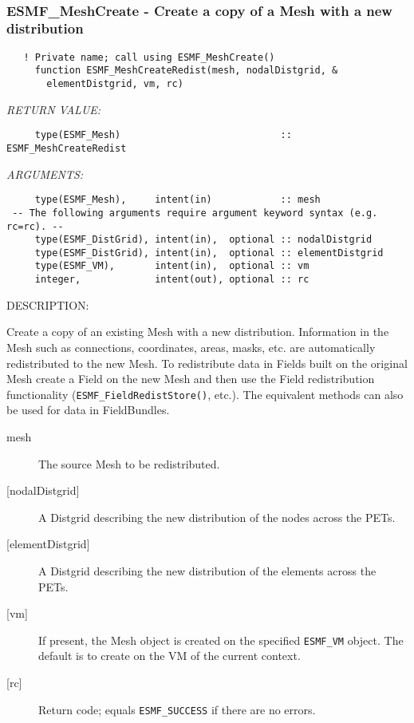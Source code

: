 
\mbox{}\hrulefill\ 
 

 \subsubsection [ESMF\_MeshCreate] {ESMF\_MeshCreate - Create a copy of a Mesh with a new distribution}


  
\begin{verbatim}   ! Private name; call using ESMF_MeshCreate()
     function ESMF_MeshCreateRedist(mesh, nodalDistgrid, &
       elementDistgrid, vm, rc)\end{verbatim}{\em RETURN VALUE:}
\begin{verbatim}     type(ESMF_Mesh)                            :: ESMF_MeshCreateRedist
 \end{verbatim}{\em ARGUMENTS:}
\begin{verbatim}     type(ESMF_Mesh),     intent(in)            :: mesh
 -- The following arguments require argument keyword syntax (e.g. rc=rc). --
     type(ESMF_DistGrid), intent(in),  optional :: nodalDistgrid
     type(ESMF_DistGrid), intent(in),  optional :: elementDistgrid
     type(ESMF_VM),       intent(in),  optional :: vm
     integer,             intent(out), optional :: rc\end{verbatim}
{\sf DESCRIPTION:\\ }


    Create a copy of an existing Mesh with a new distribution. Information
   in the Mesh such as connections, coordinates, areas, masks, etc. are
   automatically redistributed to the new Mesh. To redistribute
   data in Fields built on the original Mesh create a Field on the new Mesh
    and then use the Field redistribution functionality
   ({\tt ESMF\_FieldRedistStore()}, etc.). The equivalent methods
   can also be used for data in FieldBundles.
  
   \begin{description}
    \item [mesh]
         The source Mesh to be redistributed.
    \item [{[nodalDistgrid]}]
         A Distgrid describing the new distribution of
         the nodes across the PETs.
    \item [{[elementDistgrid]}]
         A Distgrid describing the new distribution of
         the elements across the PETs.
    \item[{[vm]}]
        If present, the Mesh object is created on the specified
        {\tt ESMF\_VM} object. The default is to create on the VM of the
        current context.
    \item [{[rc]}]
        Return code; equals {\tt ESMF\_SUCCESS} if there are no errors.
    \end{description}
   
